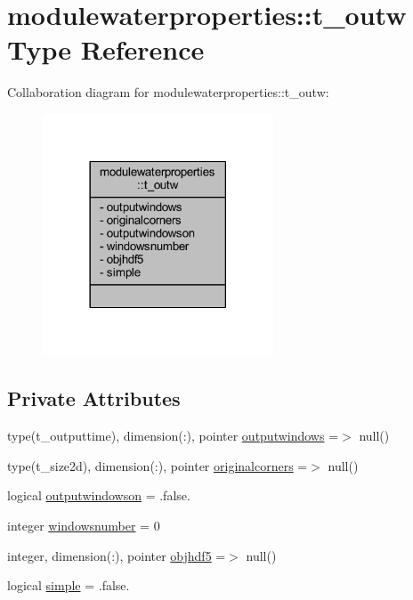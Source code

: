 \hypertarget{structmodulewaterproperties_1_1t__outw}{}\section{modulewaterproperties\+:\+:t\+\_\+outw Type Reference}
\label{structmodulewaterproperties_1_1t__outw}


Collaboration diagram for modulewaterproperties\+:\+:t\+\_\+outw\+:\nopagebreak
\begin{figure}[H]
\begin{center}
\leavevmode
\includegraphics[width=194pt]{structmodulewaterproperties_1_1t__outw__coll__graph}
\end{center}
\end{figure}
\subsection*{Private Attributes}
\begin{DoxyCompactItemize}
\item 
type(t\+\_\+outputtime), dimension(\+:), pointer \mbox{\hyperlink{structmodulewaterproperties_1_1t__outw_aa231ed8b8a295d854f013e463cf83012}{outputwindows}} =$>$ null()
\item 
type(t\+\_\+size2d), dimension(\+:), pointer \mbox{\hyperlink{structmodulewaterproperties_1_1t__outw_ab57dfae923f80b98edaa9c768ede9c2e}{originalcorners}} =$>$ null()
\item 
logical \mbox{\hyperlink{structmodulewaterproperties_1_1t__outw_a718c897de820d0be57f0123998883a07}{outputwindowson}} = .false.
\item 
integer \mbox{\hyperlink{structmodulewaterproperties_1_1t__outw_afde6595782792b57c5d221b20884fbf8}{windowsnumber}} = 0
\item 
integer, dimension(\+:), pointer \mbox{\hyperlink{structmodulewaterproperties_1_1t__outw_a784bfd3ebe052df6e6de96d616503fe3}{objhdf5}} =$>$ null()
\item 
logical \mbox{\hyperlink{structmodulewaterproperties_1_1t__outw_a4a85d94169cac12396ff337ff55075d2}{simple}} = .false.
\end{DoxyCompactItemize}


